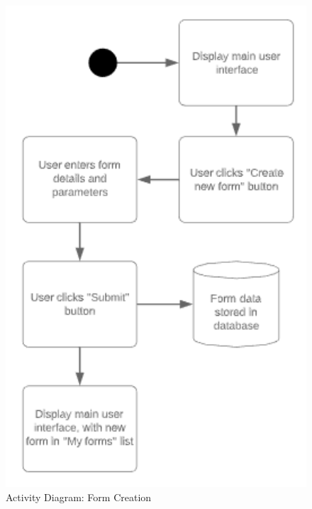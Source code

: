         \begin{figure}[!h]
            \center
            \includegraphics[width=120mm]{../figures/ActivityDiagramFormCreation}
            \caption{Activity Diagram: Form Creation}
        \end{figure}

        \pagebreak

